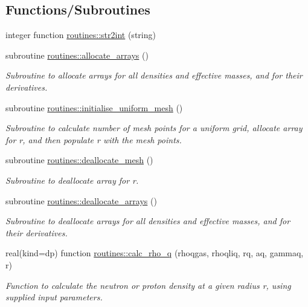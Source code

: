\subsection*{Functions/\+Subroutines}
\begin{DoxyCompactItemize}
\item 
integer function \mbox{\hyperlink{namespaceroutines_a8146fb4359e556bad19f882b8aabfc4b}{routines\+::str2int}} (string)
\item 
subroutine \mbox{\hyperlink{namespaceroutines_a0d41e4cd4e61ac1463c75055bf784e8b}{routines\+::allocate\+\_\+arrays}} ()
\begin{DoxyCompactList}\small\item\em Subroutine to allocate arrays for all densities and effective masses, and for their derivatives. \end{DoxyCompactList}\item 
subroutine \mbox{\hyperlink{namespaceroutines_a5caa9b33bdf3c960b6bb3bfa96771181}{routines\+::initialise\+\_\+uniform\+\_\+mesh}} ()
\begin{DoxyCompactList}\small\item\em Subroutine to calculate number of mesh points for a uniform grid, allocate array for r, and then populate r with the mesh points. \end{DoxyCompactList}\item 
subroutine \mbox{\hyperlink{namespaceroutines_a27ad9ac802069004010c9759fecced92}{routines\+::deallocate\+\_\+mesh}} ()
\begin{DoxyCompactList}\small\item\em Subroutine to deallocate array for r. \end{DoxyCompactList}\item 
subroutine \mbox{\hyperlink{namespaceroutines_ae7bc716d30ef4d9ecece5daa22324b77}{routines\+::deallocate\+\_\+arrays}} ()
\begin{DoxyCompactList}\small\item\em Subroutine to deallocate arrays for all densities and effective masses, and for their derivatives. \end{DoxyCompactList}\item 
real(kind=dp) function \mbox{\hyperlink{namespaceroutines_a407a248748ce7c0e2e9e5dce03cc9415}{routines\+::calc\+\_\+rho\+\_\+q}} (rhoqgas, rhoqliq, rq, aq, gammaq, r)
\begin{DoxyCompactList}\small\item\em Function to calculate the neutron or proton density at a given radius r, using supplied input parameters. \end{DoxyCompactList}\item 

\end{DoxyCompactItemize}
